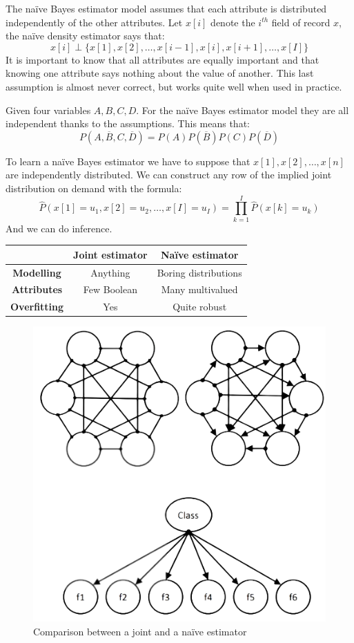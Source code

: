 \documentclass[12pt, a4paper]{report}
\begin{document}
    The naïve Bayes estimator model assumes that each attribute is distributed independently of the other attributes. Let $x[i]$ denote the $i^{th}$ field of record $x$, the naïve
    density estimator says that: 
    \[x[i] \perp \{x[1],x[2],\dots,x[i-1],x[i],x[i+1],\dots,x[I]\}\]
    It is important to know that all attributes are equally important and that knowing one attribute says nothing about the value of another. This last assumption is almost never
    correct, but works quite well when used in practice. 
    \begin{example}
        Given four variables $A,B,C,D$. For the naïve Bayes estimator model they are all independent thanks to the assumptions. This means that: 
        \[P(A,\overline{B},C,\overline{D}) = P(A)P(\overline{B})P(C)P(\overline{D})\]
    \end{example}
    To learn a naïve Bayes estimator we have to suppose that $x[1],x[2],\dots,x[n]$ are independently distributed. We can construct any row of the implied joint distribution on 
    demand with the formula: 
    \[\widehat{P}(x[1]=u_1,x[2]=u_2,\dots,x[I]=u_I) = \prod_{k=1}^{I} \widehat{P}(x[k]=u_k)\]
    And we can do inference.
    \begin{table}[H]
        \centering
        \begin{tabular}{c|c|c|}
        \cline{2-3}
                                                   & \textbf{Joint estimator} & \textbf{Naïve estimator} \\ \hline
        \multicolumn{1}{|c|}{\textbf{Modelling}}   & Anything                 & Boring distributions     \\ \cline{1-1}
        \multicolumn{1}{|c|}{\textbf{Attributes}}  & Few Boolean              & Many multivalued         \\ \cline{1-1}
        \multicolumn{1}{|c|}{\textbf{Overfitting}} & Yes                      & Quite robust             \\ \hline
        \end{tabular}
    \end{table}
    \begin{figure}[H]
        \centering
        \includegraphics[width=0.75\linewidth]{images/naive-joint.png}
        \caption{Comparison between a joint and a naïve estimator}
    \end{figure}
\end{document}

